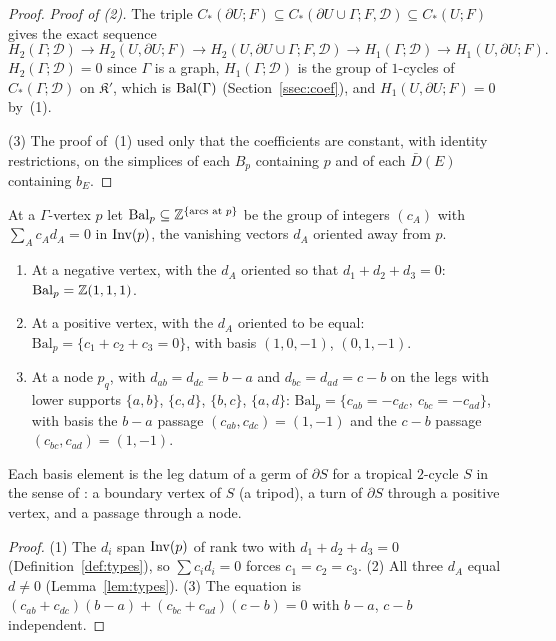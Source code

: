 \begin{proof}
\emph{Proof of (2).} The triple $C_*(\partial U;F)\subseteq C_*(\partial U\cup\Gamma;F,\mathcal D)\subseteq C_*(U;F)$ gives
the exact sequence
\[
H_2(\Gamma;\mathcal D)\to H_2(U,\partial U;F)\to H_2(U,\partial U\cup\Gamma;F,\mathcal D)\to H_1(\Gamma;\mathcal D)\to
H_1(U,\partial U;F).
\]
$H_2(\Gamma;\mathcal D)=0$ since $\Gamma$ is a graph, $H_1(\Gamma;\mathcal D)$ is the group of $1$-cycles of
$C_*(\Gamma;\mathcal D)$ on $\mathfrak K'$, which is $\mathrm{Bal}(\Gamma)$ (Section~\ref{ssec:coef}), and $H_1(U,\partial U;F)=0$ by~(1).

(3) The proof of~(1) used only that the coefficients are constant, with identity restrictions, on the simplices of each
$B_p$ containing $p$ and of each $\bar D(E)$ containing $b_E$.
\end{proof}

\begin{lemma}\label{lem:legdata}
At a $\Gamma$-vertex $p$ let $\mathrm{Bal}_p\subseteq\mathbb Z^{\{\text{arcs at }p\}}$ be the group of integers $(c_A)$ with
$\sum_Ac_Ad_A=0$ in $\operatorname{Inv}(p)$, the vanishing vectors $d_A$ oriented away from $p$.
\begin{enumerate}
\item At a negative vertex, with the $d_A$ oriented so that $d_1+d_2+d_3=0$: $\mathrm{Bal}_p=\mathbb Z(1,1,1)$.
\item At a positive vertex, with the $d_A$ oriented to be equal: $\mathrm{Bal}_p=\{c_1+c_2+c_3=0\}$, with basis
$(1,0,-1)$, $(0,1,-1)$.
\item At a node $p_q$, with $d_{ab}=d_{dc}=b-a$ and $d_{bc}=d_{ad}=c-b$ on the legs with lower supports $\{a,b\}$,
$\{c,d\}$, $\{b,c\}$, $\{a,d\}$: $\mathrm{Bal}_p=\{c_{ab}=-c_{dc},\ c_{bc}=-c_{ad}\}$, with basis the $b-a$ passage
$(c_{ab},c_{dc})=(1,-1)$ and the $c-b$ passage $(c_{bc},c_{ad})=(1,-1)$.
\end{enumerate}
Each basis element is the leg datum of a germ of $\partial S$ for a tropical $2$-cycle $S$ in the sense of \cite{CBM}:
a boundary vertex of $S$ (a tripod), a turn of $\partial S$ through a positive vertex, and a passage through a node.
\end{lemma}

\begin{proof}
(1) The $d_i$ span $\operatorname{Inv}(p)$ of rank two with $d_1+d_2+d_3=0$ (Definition~\ref{def:types}), so $\sum c_id_i=0$
forces $c_1=c_2=c_3$. (2) All three $d_A$ equal $d\ne0$ (Lemma~\ref{lem:types}). (3) The equation is
$(c_{ab}+c_{dc})(b-a)+(c_{bc}+c_{ad})(c-b)=0$ with $b-a$, $c-b$ independent.
\end{proof}

